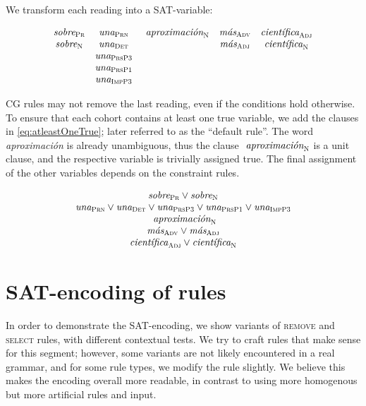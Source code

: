 \noindent We transform each reading into a SAT-variable:

\begin{equation}
\begin{array}{c c c c c}
\sobrePr & \unaPrn & \aproximacionN & \masAdv & \cientificaAdj \\
\sobreN  & \unaDet &                & \masAdj & \cientificaN \\
         & \unaPrsPThree \\
         & \unaPrsPOne \\
         & \unaImp \\
\end{array}
\end{equation}

CG rules may not remove the last reading, even if the conditions hold otherwise.
To ensure that each cohort contains at least one true variable, we add the clauses in \ref{eq:atleastOneTrue}; later referred to as the ``default rule''. 
The word \emph{aproximación} is already unambiguous, thus the clause $\text{ \em aproximaci\'{o}n}_{\text{\sc N}}$ is a unit clause, and the respective variable is trivially assigned true. 
The final assignment of the other variables depends on the constraint rules.


\begin{equation}
\begin{array}{c}
\sobrePr \vee \sobreN \\
\unaPrn \vee \unaDet \vee \unaPrsPThree \vee \unaPrsPOne \vee \unaImp \\
\aproximacionN \\
\masAdv \vee \masAdj \\
\cientificaAdj \vee \cientificaN \\
\end{array}
\label{eq:atleastOneTrue}
\end{equation}


\section{SAT-encoding of rules}

In order to demonstrate the SAT-encoding, we show variants of \textsc{remove} and \textsc{select} rules, with different contextual tests. 
We try to craft rules that make sense for this segment; however, some variants are not likely encountered in a real grammar, and for some rule types, we modify the rule slightly. We believe this makes the encoding overall more readable, in contrast to using more homogenous but more artificial rules and input.

